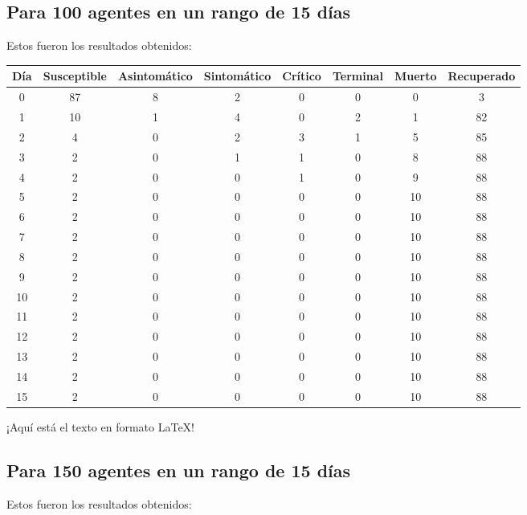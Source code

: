    \subsection{Para 100 agentes en un rango de 15 días}
    Estos fueron los resultados obtenidos:
    
    \begin{center}
    \begin{tabular}{|c|c|c|c|c|c|c|c|}
    \hline
    Día & Susceptible & Asintomático & Sintomático & Crítico & Terminal & Muerto & Recuperado \\
    \hline
    0 & 87 & 8 & 2 & 0 & 0 & 0 & 3 \\
    1 & 10 & 1 & 4 & 0 & 2 & 1 & 82 \\
    2 & 4 & 0 & 2 & 3 & 1 & 5 & 85 \\
    3 & 2 & 0 & 1 & 1 & 0 & 8 & 88 \\
    4 & 2 & 0 & 0 & 1 & 0 & 9 & 88 \\
    5 & 2 & 0 & 0 & 0 & 0 & 10 & 88 \\
    6 & 2 & 0 & 0 & 0 & 0 & 10 & 88 \\
    7 & 2 & 0 & 0 & 0 & 0 & 10 & 88 \\
    8 & 2 & 0 & 0 & 0 & 0 & 10 & 88 \\
    9 & 2 & 0 & 0 & 0 & 0 & 10 & 88 \\
    10 & 2 & 0 & 0 & 0 & 0 & 10 & 88 \\
    11 & 2 & 0 & 0 & 0 & 0 & 10 & 88 \\
    12 & 2 & 0 & 0 & 0 & 0 & 10 & 88 \\
    13 & 2 & 0 & 0 & 0 & 0 & 10 & 88 \\
    14 & 2 & 0 & 0 & 0 & 0 & 10 & 88 \\
    15 & 2 & 0 & 0 & 0 & 0 & 10 & 88 \\
    \hline
    \end{tabular}
    \end{center}

    ¡Aquí está el texto en formato LaTeX!
\subsection{Para 150 agentes en un rango de 15 días}
Estos fueron los resultados obtenidos:


